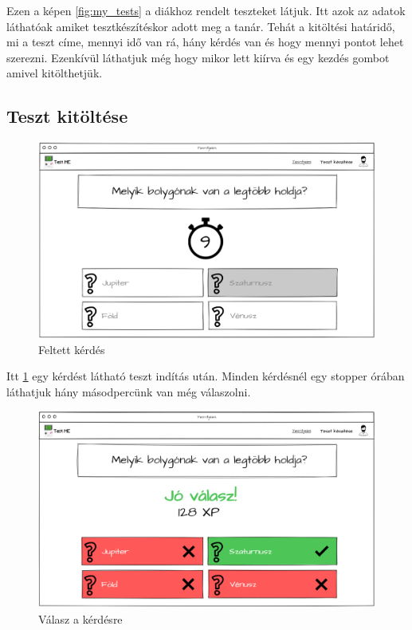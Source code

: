 Ezen a képen \ref{fig:my_tests} a diákhoz rendelt teszteket látjuk. Itt azok az adatok láthatóak amiket tesztkészítéskor adott meg a tanár. Tehát a kitöltési határidő, mi a teszt címe, mennyi idő van rá, hány kérdés van és hogy mennyi pontot lehet szerezni. Ezenkívül láthatjuk még hogy mikor lett kiírva és egy kezdés gombot amivel kitölthetjük.

\subsection{Teszt kitöltése}

\begin{figure}[H]
    \centering
    \includegraphics[width=\linewidth]{images/test1_wireframe.png}
    \caption{Feltett kérdés}
    \label{fig:test_question}
\end{figure}

Itt \ref{fig:test_question} egy kérdést látható teszt indítás után. Minden kérdésnél egy stopper órában láthatjuk hány másodpercünk van még válaszolni.

\begin{figure}[H]
    \centering
    \includegraphics[width=\linewidth]{images/test2_wireframe.png}
    \caption{Válasz a kérdésre}
    \label{fig:test_answer}
\end{figure}

